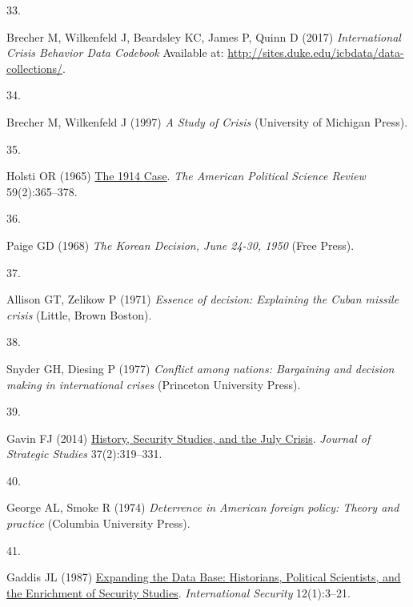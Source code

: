\documentclass[9pt,twocolumn,twoside,lineno]{pnas-new}
\newlength{\cslhangindent}
\newlength{\csllabelwidth}
\newlength{\cslentryspacingunit} %
\newenvironment{CSLReferences}[2] %
 {%
  \setlength{\parindent}{0pt}
  \ifodd #1
  \let\oldpar\par
  \def\par{\hangindent=\cslhangindent\oldpar}
  \fi
  \setlength{\parskip}{#2\cslentryspacingunit}
 }%
 {}
\newcommand{\CSLLeftMargin}[1]{\parbox[t]{\csllabelwidth}{#1}}
\newcommand{\CSLRightInline}[1]{\parbox[t]{\linewidth - \csllabelwidth}{#1}\break}
\begin{document}
\begin{CSLReferences}{0}{0}
\leavevmode{}%
\CSLLeftMargin{33. }%
\CSLRightInline{Brecher M, Wilkenfeld J, Beardsley KC, James P, Quinn D
(2017) \emph{International {Crisis Behavior Data Codebook}} Available
at: \url{http://sites.duke.edu/icbdata/data-collections/}.}

\leavevmode{}%
\CSLLeftMargin{34. }%
\CSLRightInline{Brecher M, Wilkenfeld J (1997) \emph{A {Study} of
{Crisis}} ({University of Michigan Press}).}

\leavevmode{}%
\CSLLeftMargin{35. }%
\CSLRightInline{Holsti OR (1965)
\href{https://doi.org/10.2307/1953055}{The 1914 {Case}}. \emph{The
American Political Science Review} 59(2):365--378.}

\leavevmode{}%
\CSLLeftMargin{36. }%
\CSLRightInline{Paige GD (1968) \emph{The {Korean Decision}, {June}
24-30, 1950} ({Free Press}).}

\leavevmode{}%
\CSLLeftMargin{37. }%
\CSLRightInline{Allison GT, Zelikow P (1971) \emph{Essence of decision:
{Explaining} the {Cuban} missile crisis} ({Little, Brown Boston}).}

\leavevmode{}%
\CSLLeftMargin{38. }%
\CSLRightInline{Snyder GH, Diesing P (1977) \emph{Conflict among
nations: {Bargaining} and decision making in international crises}
({Princeton University Press}).}

\leavevmode{}%
\CSLLeftMargin{39. }%
\CSLRightInline{Gavin FJ (2014)
\href{https://doi.org/10.1080/01402390.2014.912916}{History, {Security
Studies}, and the {July Crisis}}. \emph{Journal of Strategic Studies}
37(2):319--331.}

\leavevmode{}%
\CSLLeftMargin{40. }%
\CSLRightInline{George AL, Smoke R (1974) \emph{Deterrence in {American}
foreign policy: {Theory} and practice} ({Columbia University Press}).}

\leavevmode{}%
\CSLLeftMargin{41. }%
\CSLRightInline{Gaddis JL (1987)
\href{https://doi.org/10.2307/2538915}{Expanding the {Data Base}:
{Historians}, {Political Scientists}, and the {Enrichment} of {Security
Studies}}. \emph{International Security} 12(1):3--21.}


\end{CSLReferences}
\end{document}
